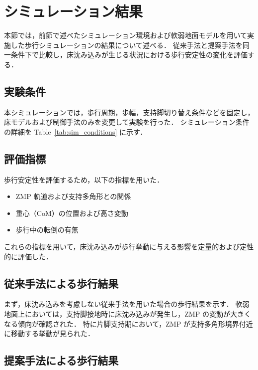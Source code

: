 \section{シミュレーション結果}
\label{sec:simulation_results}

本節では，前節で述べたシミュレーション環境および軟弱地面モデルを用いて実施した歩行シミュレーションの結果について述べる．
従来手法と提案手法を同一条件下で比較し，床沈み込みが生じる状況における歩行安定性の変化を評価する．

\subsection{実験条件}
\label{subsec:sim_conditions}

本シミュレーションでは，歩行周期，歩幅，支持脚切り替え条件などを固定し，床モデルおよび制御手法のみを変更して実験を行った．
シミュレーション条件の詳細を Table~\ref{tab:sim_conditions} に示す．


\subsection{評価指標}
\label{subsec:sim_metrics}

歩行安定性を評価するため，以下の指標を用いた．
\begin{itemize}
  \item ZMP 軌道および支持多角形との関係
  \item 重心（CoM）の位置および高さ変動
  \item 歩行中の転倒の有無
\end{itemize}
これらの指標を用いて，床沈み込みが歩行挙動に与える影響を定量的および定性的に評価した．

\subsection{従来手法による歩行結果}
\label{subsec:sim_conventional}

まず，床沈み込みを考慮しない従来手法を用いた場合の歩行結果を示す．
軟弱地面上においては，支持脚接地時に床沈み込みが発生し，ZMP の変動が大きくなる傾向が確認された．
特に片脚支持期において，ZMP が支持多角形境界付近に移動する挙動が見られた．


\subsection{提案手法による歩行結果}
\label{subsec:sim_proposed}

